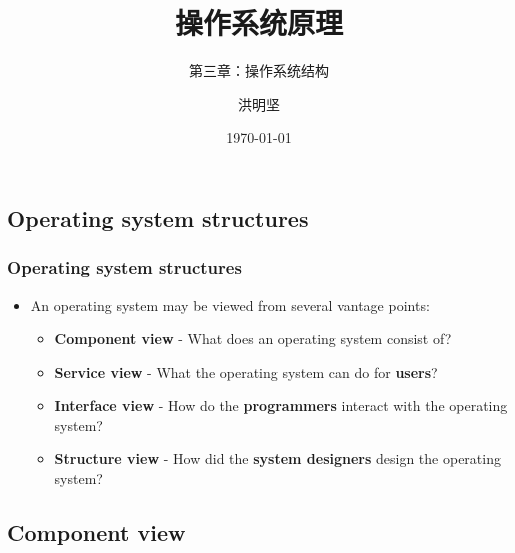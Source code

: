 \documentclass[CJKutf8,xcolor=pdftex,dvipsnames,table]{beamer}
\begin{document}
\begin{CJK*}{UTF8}{song}

  \title{ 操作系统原理}
  \subtitle{ 第三章：操作系统结构}
  \author{ 洪明坚}
  \date{\today}


  \frame{\titlepage}


  \section{Operating system structures}

  \iffalse

  \begin{frame}
    \frametitle{Operating system structures} \pause
    \begin{itemize}
    \item{An operating system may be viewed from several vantage points:} \pause
      \begin{itemize}
      \item{\textbf{Component view} \pause - What does an operating system consist of?} \pause
      \item{\textbf{Service view} \pause - What the operating system can do for \textbf{users}?} \pause
      \item{\textbf{Interface view} \pause - How do the \textbf{programmers} interact with the operating system?} \pause
      \item{\textbf{Structure view} \pause - How did the \textbf{system designers} design the operating system?}
      \end{itemize}
    \end{itemize}
  \end{frame}

  \subsection{Component view}


\end{CJK*}
\end{document}
